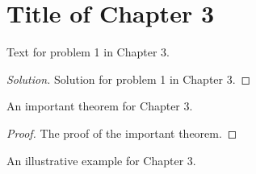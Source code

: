 \section{Title of Chapter 3}

\begin{problem}[1]
Text for problem 1 in Chapter 3.
\end{problem}
\begin{proof}[Solution]
    Solution for problem 1 in Chapter 3.
\end{proof}

\begin{theorem}
    An important theorem for Chapter 3.
\end{theorem}
\begin{proof}
    The proof of the important theorem.
\end{proof}

\begin{example}
    An illustrative example for Chapter 3.
\end{example}